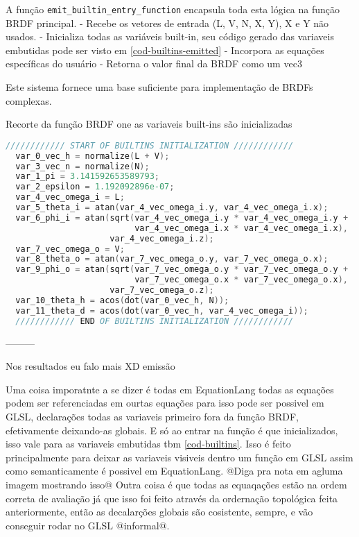 A função \verb`emit_builtin_entry_function` encapsula toda esta lógica na função BRDF principal. 
- Recebe os vetores de entrada (L, V, N, X, Y), X e Y não usados.
- Inicializa todas as variáveis built-in, seu código gerado das variaveis embutidas pode ser visto em \autoref{cod-builtins-emitted}
- Incorpora as equações específicas do usuário
- Retorna o valor final da BRDF como um vec3

Este sistema fornece uma base suficiente para implementação de BRDFs complexas. 
\begin{codigo}[htb]
    \caption{\small Recorte da função BRDF one as variaveis built-ins são inicializadas }
    \label{cod-builtins-emitted}
\begin{lstlisting}[language=C, frame=none, inputencoding=utf8]
  //////////// START OF BUILTINS INITIALIZATION ////////////
  var_0_vec_h = normalize(L + V);
  var_3_vec_n = normalize(N);
  var_1_pi = 3.141592653589793;
  var_2_epsilon = 1.192092896e-07;
  var_4_vec_omega_i = L;
  var_5_theta_i = atan(var_4_vec_omega_i.y, var_4_vec_omega_i.x);
  var_6_phi_i = atan(sqrt(var_4_vec_omega_i.y * var_4_vec_omega_i.y +
                          var_4_vec_omega_i.x * var_4_vec_omega_i.x),
                     var_4_vec_omega_i.z);
  var_7_vec_omega_o = V;
  var_8_theta_o = atan(var_7_vec_omega_o.y, var_7_vec_omega_o.x);
  var_9_phi_o = atan(sqrt(var_7_vec_omega_o.y * var_7_vec_omega_o.y +
                          var_7_vec_omega_o.x * var_7_vec_omega_o.x),
                     var_7_vec_omega_o.z);
  var_10_theta_h = acos(dot(var_0_vec_h, N));
  var_11_theta_d = acos(dot(var_0_vec_h, var_4_vec_omega_i));
  //////////// END OF BUILTINS INITIALIZATION ////////////
\end{lstlisting}
\end{codigo}




---------

Nos resultados eu falo mais XD emissão

Uma coisa imporatnte a se dizer é todas em EquationLang todas as equações podem ser referenciadas em ourtas equações para isso pode ser possivel em GLSL, declarações todas as variaveis primeiro fora da função BRDF, efetivamente deixando-as globais. E só ao entrar na função é que inicializados, isso vale para as variaveis embutidas tbm \autoref{cod-builtins}. Isso é feito principalmente para deixar as variaveis visiveis dentro um função em GLSL assim como semanticamente é possivel em EquationLang. @Diga pra nota em agluma imagem mostrando isso@ Outra coisa é que todas as equaqações estão na ordem correta de avaliação já que isso foi feito através da ordernação topológica feita anteriormente, então as decalarções globais são cosistente, sempre, e vão conseguir rodar no GLSL @informal@.

